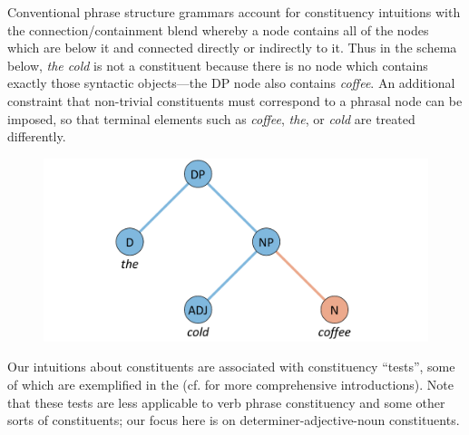   Conventional phrase structure grammars account for constituency intuitions with the connection/containment blend whereby a node contains all of the nodes which are below it and connected directly or indirectly to it. Thus in the schema below, \textit{the cold} is not a constituent because there is no node which contains exactly those syntactic objects—the DP node also contains \textit{coffee}. An additional constraint that non-trivial constituents must correspond to a phrasal node can be imposed, so that terminal elements such as \textit{coffee}, \textit{the}, or \textit{cold} are treated differently. 

  
\begin{figure}
\includegraphics[width=\textwidth]{figures/Tilsen-img136.png}
\caption{\missingcaption}
\label{fig:6:17}
\end{figure}
 

  Our intuitions about constituents are associated with constituency “tests”, some of which are exemplified in the {\tablebelow} (cf. \citealt{Carnie2013,Ouhalla1999} for more comprehensive introductions). Note that these tests are less applicable to verb phrase constituency and some other sorts of constituents; our focus here is on determiner-adjective-noun constituents.

